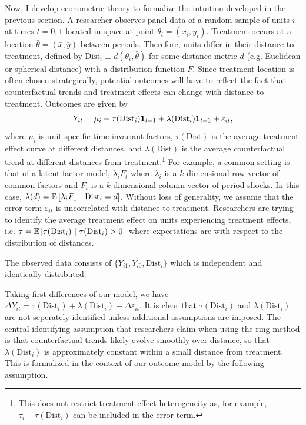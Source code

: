 \documentclass[10pt]{article}
\newcommand{\dist}{\text{Dist}}
\begin{document}
Now, I develop econometric theory to formalize the intuition developed in the previous section. A researcher observes panel data of a random sample of units $i$ at times $t = 0, 1$ located in space at point $\theta_i = (x_i, y_i)$. Treatment occurs at a location $\bar{\theta} = (\bar{x}, \bar{y})$ between periods. Therefore, units differ in their distance to treatment, defined by $\dist_i \equiv d(\theta_i, \bar{\theta})$ for some distance metric $d$ (e.g. Euclidean or spherical distance) with a distribution function $F$. Since treatment location is often chosen strategically, potential outcomes will have to reflect the fact that counterfactual trends and treatment effects can change with distance to treatment. Outcomes are given by 
\begin{equation}\label{eq:model}
    Y_{it} = \mu_i + \tau(\dist_i) \one_{t = 1} + \lambda(\dist_i) \one_{t=1} + \varepsilon_{it},    
\end{equation}
where $\mu_i$ is unit-specific time-invariant factors, $\tau(\dist)$ is the average treatment effect curve at different distances, and $\lambda(\dist)$ is the average counterfactual trend at different distances from treatment.\footnote{This does not restrict treatment effect heterogeneity as, for example, $\tau_i - \tau(\dist_i)$ can be included in the error term.} For example, a common setting is that of a latent factor model, $\lambda_i F_t$ where $\lambda_i$ is a $k$-dimensional row vector of common factors and $F_t$ is a $k$-dimensional column vector of period shocks. In this case, $\lambda(d) = \condexpec{\lambda_i F_1}{\dist_i = d}$. Without loss of generality, we assume that the error term $\varepsilon_{it}$ is uncorrelated with distance to treatment. Researchers are trying to identify the average treatment effect on units experiencing treatment effects, i.e. $\bar{\tau} = \condexpec{\tau(\dist_i)}{\tau(\dist_i) > 0}$ where expectations are with respect to the distribution of distances.

\begin{assumption}
    The observed data consists of $\{ Y_{i1}, Y_{i0}, \dist_{i}\}$ which is independent and identically distributed.
\end{assumption}

Taking first-differences of our model, we have $\Delta Y_{it} = \tau(\dist_i) + \lambda(\dist_i) + \Delta \varepsilon_{it}$. It is clear that $\tau(\dist_i)$ and $\lambda(\dist_i)$ are not seperately identified unless additional assumptions are imposed. The central identifying assumption that researchers claim when using the ring method is that counterfactual trends likely evolve smoothly over distance, so that $\lambda(\dist_i)$ is approximately constant within a small distance from treatment. This is formalized in the context of our outcome model by the following assumption. 
\end{document}
